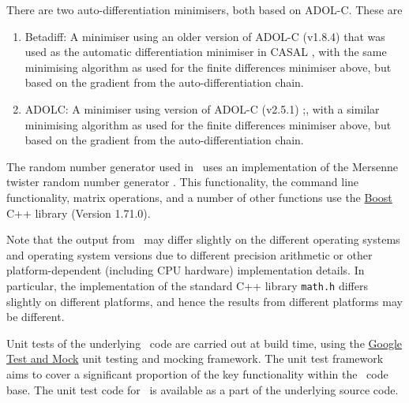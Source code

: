 There are two auto-differentiation minimisers, both based on ADOL-C. These are
\begin{enumerate}
\item Betadiff: A minimiser using an older version of ADOL-C (v1.8.4) that was used as the automatic differentiation minimiser in CASAL \citep{1388}, with the same minimising algorithm as used for the finite differences minimiser above, but based on the gradient from the auto-differentiation chain.
\item ADOLC: A minimiser using version of ADOL-C (v2.5.1) \citep{walther1996adolc};, with a similar minimising algorithm as used for the finite differences minimiser above, but based on the gradient from the auto-differentiation chain.
\end{enumerate}

The random number generator used in \CNAME\ uses an implementation of the Mersenne twister random number generator \citep{796}. This functionality, the command line functionality, matrix operations, and a number of other functions use the \href{http://www.boost.org/}{Boost} C++ library (Version 1.71.0).

Note that the output from \CNAME\ may differ slightly on the different operating systems and operating system versions due to different precision arithmetic or other platform-dependent (including CPU hardware) implementation details. In particular, the implementation of the standard C++ library \texttt{math.h} differs slightly on different platforms, and hence the results from different platforms may be different.

Unit tests of the underlying \CNAME\ code are carried out at build time, using the \href{https://github.com/google/googletest}{Google Test and Mock} unit testing and mocking framework. The unit test framework aims to cover a significant proportion of the key functionality within the \CNAME\ code base. The unit test code for \CNAME\ is available as a part of the underlying source code.


